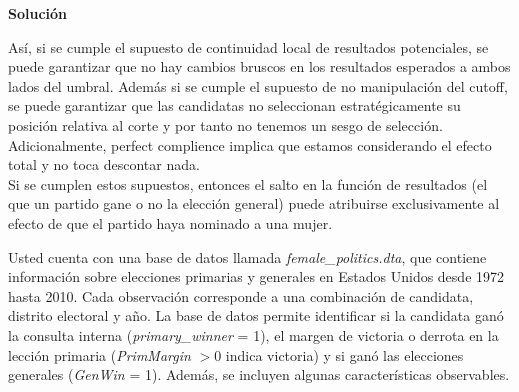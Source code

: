 \documentclass[a4paper, answers, addpoints, 11pt]{exam}
\newenvironment{solucion}{%
  \begin{mdframed}[
    backgroundcolor=blue!5,    %
    linecolor=blue!50,          %
    linewidth=2pt,              %
    leftmargin=10pt,            %
    rightmargin=8pt,           %
    topline=true,              %
    bottomline=true,            %
    roundcorner=10pt,           %
    innerleftmargin=10pt,       %
    innerrightmargin=10pt,      %
    innerbottommargin=10pt,     %
    innertopmargin=10pt         %
  ]%
  \begin{tcolorbox}[colframe=blue!50!black, colback=blue!50, coltitle=white, sharp corners=all, boxrule=1mm, width=\textwidth, halign=left, valign=center, top=0mm, bottom=0mm, left=0mm, right=0mm] \textbf{Solución} \end{tcolorbox} }{\end{mdframed}}
\begin{document}
\begin{enumerate}
\begin{enumerate}
\begin{solucion}
Así, si se cumple el supuesto de continuidad local de resultados potenciales, se puede garantizar que no hay cambios bruscos en los resultados esperados a ambos lados del umbral. Además si se cumple el supuesto de no manipulación del cutoff, se puede garantizar que las candidatas no seleccionan estratégicamente su posición relativa al corte y por tanto no tenemos un sesgo de selección. Adicionalmente, perfect complience implica que estamos considerando el efecto total y no toca descontar nada.\\
Si se cumplen estos supuestos, entonces el salto en la función de resultados (el que un partido gane o no la elección general) puede atribuirse exclusivamente al efecto de que el partido haya nominado a una mujer.
\end{solucion}
        \end{enumerate}

\end{enumerate}

Usted cuenta con una base de datos llamada \textit{female\_politics.dta}, que contiene información sobre elecciones primarias y generales en Estados Unidos desde 1972 hasta 2010. Cada observación corresponde a una combinación de candidata, distrito electoral y año. La base de datos permite identificar si la candidata ganó la consulta interna (\textit{primary\_winner} = 1), el margen de victoria o derrota en la lección primaria (\textit{PrimMargin} $> 0$ indica victoria) y si ganó las elecciones generales (\textit{GenWin} = 1). Además, se incluyen algunas características observables.
\end{document}
